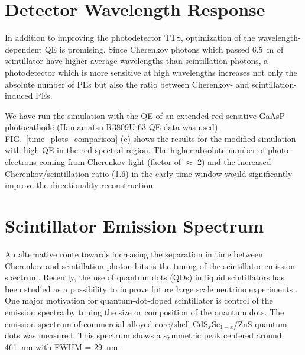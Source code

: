 \documentclass[aps,prc,twocolumn,groupedaddress,showpacs,amsmath,amssymb,floatfix,superscriptaddress]{revtex4}
\begin{document}
\section{Detector Wavelength Response}
\label{detector_wavelength_response_sec} 
In addition to improving the photodetector TTS, optimization of the
wavelength-dependent QE is promising. Since Cherenkov photons which
passed 6.5~m of scintillator have higher average wavelengths than
scintillation photons, a photodetector which is more sensitive at high
wavelengths increases not only the absolute number of PEs but also the
ratio between Cherenkov- and scintillation-induced PEs. 

We have run the simulation with the QE of an extended red-sensitive
GaAsP photocathode (Hamamatsu R3809U-63 QE data was used).  FIG.~\ref{time_plots_comparison} (c) shows the results for the modified
simulation with high QE in the red spectral region. The higher
absolute number of photo-electrons coming from Cherenkov light (factor
of $\approx$ 2) and the increased Cherenkov/scintillation ratio (1.6) in the early time window would significantly improve the directionality
reconstruction.

\section{Scintillator Emission Spectrum}
\label{scintillator_emission_sec}
An alternative route towards increasing the separation in time between
Cherenkov and scintillation photon hits is the tuning of the
scintillator emission spectrum. Recently, the use of quantum dots
(QDs) in liquid scintillators has been studied as a possibility to
improve future large scale neutrino experiments \cite{qdot2}. One
major motivation for quantum-dot-doped scintillator is control of the
emission spectra by tuning the size or composition of the quantum
dots. The emission spectrum of commercial alloyed core/shell
CdS$_x$Se$_{1-x}$/ZnS quantum dots was measured. This spectrum shows a
symmetric peak centered around 461~nm with FWHM = 29~nm.
\end{document}
